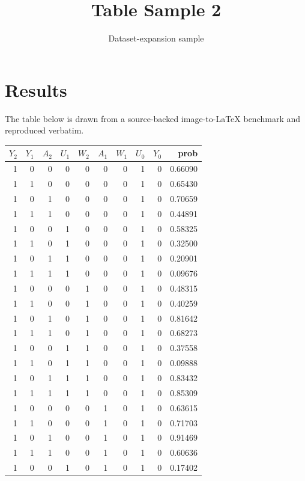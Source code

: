 \documentclass[11pt]{article}
\title{Table Sample 2}
\author{Dataset-expansion sample}
\date{}
\begin{document}
\maketitle
\section{Results}
The table below is drawn from a source-backed image-to-LaTeX benchmark and reproduced verbatim.

\begin{table}
[ht]
\centering
\renewcommand{\arraystretch}{0.8}
\begin{tabular}
{rrrrrrrrrr}
\hline
$Y_2$ & $Y_1$ & $A_2$ & $U_1$ & $W_2$ & $A_1$ & $W_1$ & $U_0$ & $Y_0$ & prob \\
\hline
1 & 0 & 0 & 0 & 0 & 0 & 0 & 1 & 0 & 0.66090 \\
1 & 1 & 0 & 0 & 0 & 0 & 0 & 1 & 0 & 0.65430 \\
1 & 0 & 1 & 0 & 0 & 0 & 0 & 1 & 0 & 0.70659 \\
1 & 1 & 1 & 0 & 0 & 0 & 0 & 1 & 0 & 0.44891 \\
1 & 0 & 0 & 1 & 0 & 0 & 0 & 1 & 0 & 0.58325 \\
1 & 1 & 0 & 1 & 0 & 0 & 0 & 1 & 0 & 0.32500 \\
1 & 0 & 1 & 1 & 0 & 0 & 0 & 1 & 0 & 0.20901 \\
1 & 1 & 1 & 1 & 0 & 0 & 0 & 1 & 0 & 0.09676 \\
1 & 0 & 0 & 0 & 1 & 0 & 0 & 1 & 0 & 0.48315 \\
1 & 1 & 0 & 0 & 1 & 0 & 0 & 1 & 0 & 0.40259 \\
1 & 0 & 1 & 0 & 1 & 0 & 0 & 1 & 0 & 0.81642 \\
1 & 1 & 1 & 0 & 1 & 0 & 0 & 1 & 0 & 0.68273 \\
1 & 0 & 0 & 1 & 1 & 0 & 0 & 1 & 0 & 0.37558 \\
1 & 1 & 0 & 1 & 1 & 0 & 0 & 1 & 0 & 0.09888 \\
1 & 0 & 1 & 1 & 1 & 0 & 0 & 1 & 0 & 0.83432 \\
1 & 1 & 1 & 1 & 1 & 0 & 0 & 1 & 0 & 0.85309 \\
1 & 0 & 0 & 0 & 0 & 1 & 0 & 1 & 0 & 0.63615 \\
1 & 1 & 0 & 0 & 0 & 1 & 0 & 1 & 0 & 0.71703 \\
1 & 0 & 1 & 0 & 0 & 1 & 0 & 1 & 0 & 0.91469 \\
1 & 1 & 1 & 0 & 0 & 1 & 0 & 1 & 0 & 0.60636 \\
1 & 0 & 0 & 1 & 0 & 1 & 0 & 1 & 0 & 0.17402 \\

\end{tabular}
\end{table}
\end{document}
